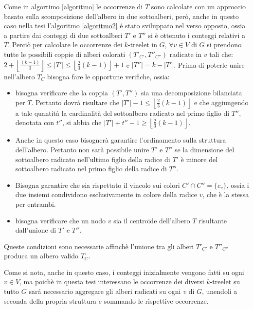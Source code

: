 Come in algortimo \ref{algoritmo} le occorrenze di $ T $ sono calcolate con un approccio basato sulla scomposizione dell'albero in due sottoalberi,  per\`o, anche in questo caso nella tesi l'algoritmo \ref{algoritmo2} \'e stato sviluppato nel verso opposto, ossia a partire dai conteggi di due sottoalberi $ T' $ e $ T'' $ si \`e ottenuto i conteggi relativi a $ T $.
Perci\`o per calcolare le occorrenze dei $ k $-treelet in $ G $, $ \forall v \in V $ di $ G $ si prendono tutte le possibili coppie di alberi colorati $ (T'_{C'}, T''_{C''} )$ radicate in $ v $ tali che: $ 2+ \left\lfloor \frac{(k-1)}{3}  \right\rfloor \le |T'| \le \left\lfloor \frac{2}{3}(k-1) \right\rfloor  +1 $ e $ |T''| = k-|T'| $.
Prima di poterle unire nell'albero $ T_C $ bisogna fare le opportune verifiche, ossia:
\begin{itemize}
	\label{prova}
	\item bisogna verificare che la coppia $ (T',T'') $ sia una decomposizione bilanciata per $ T $.
	Pertanto dovr\`a risultare che $ |T'| - 1 \le \left\lfloor\frac{2}{3}(k-1)\right\rfloor $ e che aggiungendo a tale quantit\`a la cardinalit\`a del sottoalbero radicato nel primo figlio di $ T'' $, denotata con $ t'' $, si abbia che $ |T'| + t'' - 1 \ge \left\lfloor\frac{2}{3}(k-1)\right\rfloor $.
	\item Anche in questo caso bisogner\`a garantire l'ordinamento sulla struttura dell'albero.
	Pertanto non sar\`a possibile unire $ T' $ e $ T'' $ se la dimensione del sottoalbero radicato nell'ultimo figlio della radice di $ T' $ \`e minore del sottoalbero radicato nel primo figlio della radice di $ T'' $.
	\item Bisogna garantire che sia rispettato il vincolo sui colori $ C' \cap C'' = \{c_v\}$, ossia i due insiemi condividono esclusivamente in colore della radice $ v $, che \`e la stessa per entrambi. 
	\item bisogna verificare che un nodo $ v $ sia il centroide dell'albero $ T $ risultante dall'unione di $ T' $ e $ T'' $.
\end{itemize}
Queste condizioni sono necessarie affinch\`e l'unione tra gli alberi $ T'_{C'} $ e $ T''_{C''} $ produca un albero valido $ T_C $.

Come si nota, anche in questo caso, i conteggi inizialmente vengono fatti su ogni $ v\in V $, ma poich\`e in questa tesi interessano le occorrenze dei diversi $ k $-treelet su tutto $ G $  sar\'a necessario aggregare gli alberi radicati su ogni $ v $ di $ G $, unendoli a seconda della propria struttura e sommando le rispettive occorrenze.

